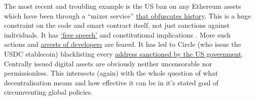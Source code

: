 The most recent and troubling example is the US ban on any Ethereum assets which have been through a ``mixer service'' \href{https://www.coincenter.org/u-s-treasury-sanction-of-privacy-tools-places-sweeping-restrictions-on-all-americans/}{that obfuscates history}. This is a huge constraint on the code and smart contract itself, not just sanctions against individuals. It has \href{https://hoffmang9.github.io/free-speech/the-history-code-is-free-speech.html}{`free speech'} and constitutional implications \cite{anderson2002free}. More such actions and \href{https://www.dw.com/en/dutch-investigators-say-developer-of-tornado-cash-arrested/a-62793823}{arrests of developers} are feared. It has led to Circle (who issue the USDC stablecoin) blacklisting every \href{https://home.treasury.gov/policy-issues/financial-sanctions/recent-actions/20220808}{address sanctioned by the US government}. Centrally issued digital assets are obviously neither uncensorable nor permissionless. This intersects (again) with the whole question of what decentralisation means and how effective it can be in it's stated goal of circumventing global policies.
